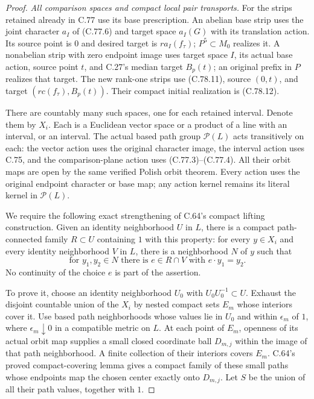 \begin{proof}
\emph{All comparison spaces and compact local pair transports.}
For the strips retained already in C.77 use its
base prescription. An abelian base strip uses
the joint character $a_I$ of (C.77.6) and target
space $a_I(G)$ with its translation action.
Its source point is $0$ and desired target is
$r a_I(f_\tau)$; $P^5\subset M_0$ realizes it.
A nonabelian strip with zero endpoint image uses
target space $I$, its actual base action, source
point $t$, and C.27's median target $B_p(t)$;
an original prefix in $P$ realizes that target.
The new rank-one strips use (C.78.11), source
$(0,t)$, and target $(r c(f_\tau),B_p(t))$.
Their compact initial realization is (C.78.12).

There are countably many such spaces, one for
each retained interval. Denote them by $X_i$.
Each is a Euclidean vector space or a product
of a line with an interval, or an interval.
The actual based path group $\mathscr P(L)$
acts transitively on each: the vector action
uses the original character image, the interval
action uses C.75, and the comparison-plane
action uses (C.77.3)--(C.77.4).
All their orbit maps are open by the same
verified Polish orbit theorem. Every action
uses the original endpoint character or base
map; any action kernel remains its literal
kernel in $\mathscr P(L)$.

We require the following exact strengthening
of C.64's compact lifting construction. Given
an identity neighborhood $U$ in $L$, there is
a compact path-connected family $R\subset U$
containing $1$ with this property: for every
$y\in X_i$ and every identity neighborhood $V$
in $L$, there is a neighborhood $N$ of $y$
such that
\[
 \text{for }y_1,y_2\in N\text{ there is }e\in R\cap V
                       \text{ with }e\cdot y_1=y_2.
                                                               \tag{C.78.13}
\]
No continuity of the choice $e$ is part of the
assertion.

To prove it, choose an identity neighborhood
$U_0$ with $U_0U_0^{-1}\subset U$.
Exhaust the disjoint countable union of the
$X_i$ by nested compact sets $E_m$ whose
interiors cover it. Use based path neighborhoods
whose values lie in $U_0$ and within $\epsilon_m$
of $1$, where $\epsilon_m\downarrow0$ in a
compatible metric on $L$. At each point of
$E_m$, openness of its actual orbit map supplies
a small closed coordinate ball $D_{m,j}$ within
the image of that path neighborhood. A finite
collection of their interiors covers $E_m$.
C.64's proved compact-covering lemma gives a
compact family of these small paths whose
endpoints map the chosen center exactly onto
$D_{m,j}$. Let $S$ be the union of all their
path values, together with $1$.


\end{proof}
